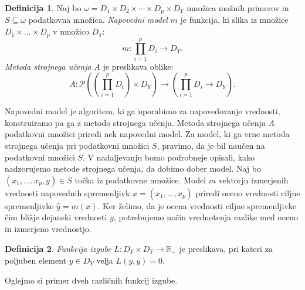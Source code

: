 \documentclass[12pt,a4paper,twoside]{article}
\theoremstyle{definition} %
\newtheorem{definicija}{Definicija}[section]
\theoremstyle{plain} %
\numberwithin{equation}{section}  %
\begin{document}
\begin{definicija}
\label{def:model_metoda}
	Naj bo $\omega = D_1 \times D_2 \times \cdots \times D_p \times D_Y$ množica možnih primerov in $S \subseteq \omega$ podatkovna množica.
	\emph{Napovedni model} $m$ je funkcija, ki slika iz množice $D_1 \times \ldots \times D_p$ v množico $D_Y$:
	\[
	m: \prod_{i=1}^p D_i \rightarrow D_Y.
	\]
	\emph{Metoda strojnega učenja} $A$ je preslikava oblike:
	\[
	A: \mathcal{P} \left( \left(\prod_{i=1}^p D_i \right) \times D_Y \right) \rightarrow \left(\prod_{i=1}^p D_i \rightarrow D_Y \right).
	\]
\end{definicija}

Napovedni model je algoritem, ki ga uporabimo za napovedovanje vrednosti, konstruiramo pa ga z metodo strojnega učenja.
Metoda strojnega učenja $A$ podatkovni množici priredi nek napovedni model. 
Za model, ki ga vrne metoda strojnega učenja pri podatkovni množici $S$, pravimo, da je bil naučen na podatkovni množici $S$.
V nadaljevanju bomo podrobneje opisali, kako nadzorujemo metode strojnega učenja, da dobimo dober model.
Naj bo $(x_1, \ldots, x_p,y) \in S$ točka iz podatkovne množice.
Model $m$ vektorju izmerjenih vrednosti napovednih spremenljivk $x=(x_1, \ldots, x_p)$ priredi oceno vrednosti ciljne spremenljivke $\hat{y}=m(x)$.
Ker želimo, da je ocena vrednosti ciljne spremenljivke čim bližje dejanski vrednosti $y$, potrebujemo način vrednotenja razlike med oceno in izmerjeno vrednostjo.

\begin{definicija}
	\emph{Funkcija izgube} $L: D_Y \times D_Y \rightarrow \mathbb{R}_+$ je preslikava, pri kateri za poljuben element $y \in D_Y$ velja $L(y,y) = 0$.
\end{definicija}

Oglejmo si primer dveh različnih funkcij izgube.
\end{document}
